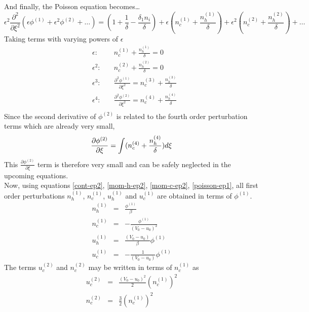 \documentclass[a4paper, 12pt]{article}
\begin{document}
\newline
\newline
And finally, the Poisson equation becomes\dots
\begin{equation}
    \epsilon^2 \frac{\partial^2}{\partial\xi^2}(\epsilon\phi^{(1)} + \epsilon^2\phi^{(2)}+\dots) = (1+\frac{1}{\delta}-\frac{\delta_1 n_i}{\delta}) + \epsilon (n_c^{(1)} + \frac{n_h^{(1)}}{\delta}) + \epsilon^2 (n_c^{(2)} + \frac{n_h^{(2)}}{\delta}) +\dots    
\end{equation}
Taking terms with varying powers of $\epsilon$
\begin{eqnarray}
     &\epsilon:& \quad n_c^{(1)} + \frac{n_h^{(1)}}{\delta} = 0 \label{poisson-ep1} \\
     &\epsilon^2:& \quad n_c^{(2)} + \frac{n_h^{(2)}}{\delta} = 0 \label{poisson-ep2} \\
     &\epsilon^3:& \quad \frac{\partial^2 \phi^{(1)}}{\partial \xi^2} = n_c^{(3)} + \frac{n_h^{(3)}}{\delta} \label{poisson-ep3} \\
     &\epsilon^4:& \quad \frac{\partial^2 \phi^{(2)}}{\partial\xi^2} = n_c^{(4)} + \frac{n_h^{(4)}}{\delta} \label{poisson-ep4} \\
\end{eqnarray}
Since the second derivative of $\phi^{(2)}$ is related to the fourth order perturbation terms which are already very small,
\begin{equation}
    \frac{\partial\phi^{(2)}}{\partial\xi} = \int (n_c^{(4)} + \frac{n_h^{(4)}}{\delta}) d\xi \notag
\end{equation}
This $\frac{\partial \phi^{(2)}}{\partial \xi}$ term is therefore very small and can be safely neglected in the upcoming equations.\\
\noindent Now, using equations \ref{cont-ep2}, \ref{mom-h-ep2}, \ref{mom-c-ep2}, \ref{poisson-ep1}, all first order perturbations $n_h^{(1)}$, $n_c^{(1)}$, $u_h^{(1)}$ and $u_c^{(1)}$ are obtained in terms of $\phi^{(1)}$.
\begin{eqnarray}
    n_h^{(1)} &=& \frac{\phi^{(1)}}{\beta}\\
    n_c^{(1)} &=& -\frac{\phi^{(1)}}{(V_0 - u_0)^2}\\
    u_h^{(1)} &=& \frac{(V_0 - u_0)}{\beta}\phi^{(1)}\\
    u_c^{(1)} &=& -\frac{1}{(V_0 - u_0)}\phi^{(1)}
\end{eqnarray}
\newline
The terms $u_c^{(2)}$ and $n_c^{(2)}$ may be written in terms of $n_c^{(1)}$ as
\begin{eqnarray}
    u_c^{(2)} &=& \frac{(V_0 - u_0)^2}{2} (n_c^{(1)})^2\\
    n_c^{(2)} &=& \frac{3}{2}(n_c^{(1)})^2
\end{eqnarray}
\end{document}
